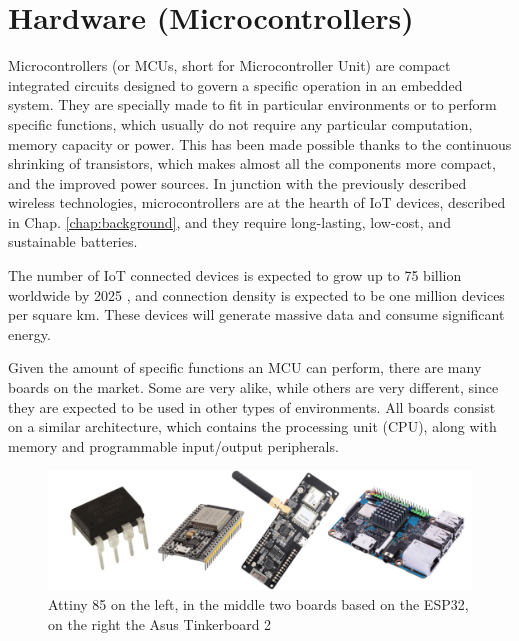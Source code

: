 	

\section{Hardware (Microcontrollers)}\label{sec:microcontrollers}

	Microcontrollers (or MCUs, short for Microcontroller Unit) are compact integrated circuits designed to govern a specific operation in an embedded system.
	They are specially made to fit in particular environments or to perform specific functions, which usually do not require any particular computation, memory capacity or power.
	This has been made possible thanks to the continuous shrinking of transistors, which makes almost all the components more compact, and the improved power sources.
	In junction with the previously described wireless technologies, microcontrollers are at the hearth of IoT devices, described in Chap. \ref{chap:background}, and they require long-lasting, low-cost, and sustainable batteries.
	
	The number of IoT connected devices is expected to grow up to 75 billion worldwide by 2025 \cite{statista}, and connection density is expected to be one million devices per square km\cite{noma}.
	These devices will generate massive data and consume significant energy.
	
	Given the amount of specific functions an MCU can perform, there are many boards on the market.
	Some are very alike, while others are very different, since they are expected to be used in other types of environments.
	All boards consist on a similar architecture, which contains the processing unit (CPU), along with memory and programmable input/output peripherals.
	
	\begin{figure}[H]
		\centering
		\includegraphics[width=\textwidth]{resources/img/chap3/generic_board}
		\caption{Attiny 85 on the left, in the middle two boards based on the ESP32, on the right the Asus Tinkerboard 2}
		\label{img:generic_board}
	\end{figure}


